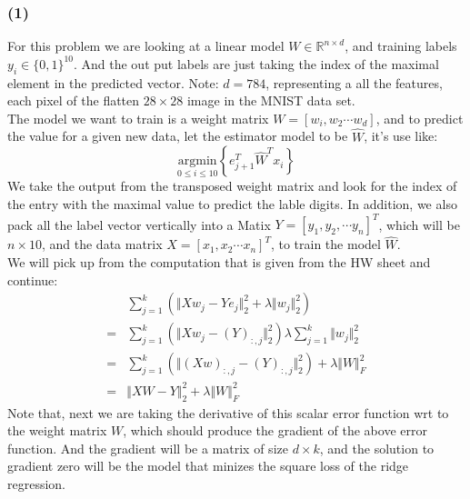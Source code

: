 \documentclass[]{article}
\begin{document}
        \subsubsection*{(1)}
            For this problem we are looking at a linear model $W\in\mathbb{R}^{n\times d}$, and training labels $y_i\in \{0, 1\}^{10}$. And the out put labels are just taking the index of the maximal element in the predicted vector. Note: $d = 784$, representing a all the features, each pixel of the flatten $28 \times 28$ image in the MNIST data set.
            \\
            The model we want to train is a weight matrix $W = [w_i, w_2 \cdots w_d]$, and to predict the value for a given new data, let the estimator model to be $\hat{W}$, it's use like: 
            $$  
                \underset{0\le i \le 10}{\text{argmin}}\left\lbrace
                    e_{j + 1}^T\widehat{W}^Tx_i
                \right\rbrace
            $$
            We take the output from the transposed weight matrix and look for the index of the entry with the maximal value to predict the lable digits. In addition, we also pack all the label vector vertically into a Matix $Y = [y_1, y_2, \cdots y_n]^T$, which will be $n \times 10$, and the data matrix $X = [x_1, x_2 \cdots x_n]^T$, to train the model $\widehat{W}$. 
            \\
            We will pick up from the computation that is given from the HW sheet and continue: 
            \begin{align*}\tag{A.6.1}\label{eqn:A.6.1}
                &\sum_{j = 1}^{k}
                \left(
                        \Vert Xw_j - Ye_j\Vert_2^2 + \lambda \Vert w_j\Vert^2_2
                \right)
                \\
                =& 
                \sum_{j = 1}^{k}\left(
                    \Vert Xw_j - (Y)_{:, j} \Vert_2^2
                \right)
                \lambda \sum_{j = 1}^{k}\Vert w_j\Vert_2^2
                \\
                =&
                \sum_{j = 1}^{k}\left(
                    \Vert (Xw)_{:, j} - (Y)_{:, j} \Vert_2^2
                \right)
                + 
                \lambda \Vert W\Vert_F^2
                \\
                = &
                \Vert XW  - Y\Vert_2^2 + \lambda\Vert W\Vert_F^2
            \end{align*}
            Note that, next we are taking the derivative of this scalar error function wrt to the weight matrix $W$, which should produce the gradient of the above error function. And the gradient will be a matrix of size $d\times k$, and the solution to gradient zero will be the model that minizes the square loss of the ridge regression. 
\end{document}
